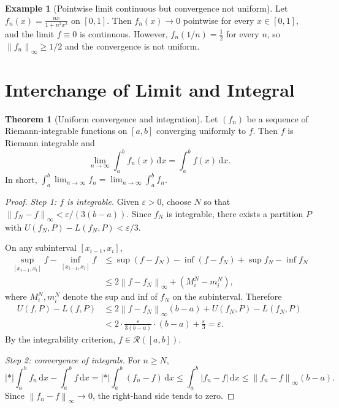 \documentclass[12pt,a4paper]{book}
\theoremstyle{definition}
\newtheorem{theorem}{Theorem}[chapter]
\newtheorem{example}{Example}[chapter]
\newcommand{\eps}{\varepsilon}
\newcommand{\abs}[1]{\left\lvert #1 \right\rvert}
\newcommand{\norm}[1]{\left\lVert #1 \right\rVert}
\newcommand{\dd}{\,\mathrm{d}}
\begin{document}
\begin{example}[Pointwise limit continuous but convergence not uniform]\label{ex:pw-cont-not-unif}
  Let $f_n(x)=\frac{nx}{1+n^2x^2}$ on $[0,1]$.  Then $f_n(x)\to0$
  pointwise for every $x\in[0,1]$, and the limit $f\equiv0$ is
  continuous.  However, $f_n(1/n)=\frac{1}{2}$ for every $n$, so
  $\norm{f_n}_\infty\ge 1/2$ and the convergence is not uniform.
\end{example}


\section{Interchange of Limit and Integral}\label{sec:interchange-int}

\begin{theorem}[Uniform convergence and integration]\label{thm:unif-int}
  Let $(f_n)$ be a sequence of Riemann-integrable functions on $[a,b]$
  converging uniformly to $f$.  Then $f$ is Riemann integrable and
  \[
    \lim_{n\to\infty}\int_a^b f_n(x)\dd x = \int_a^b f(x)\dd x.
  \]
  In short, $\displaystyle\int_a^b\lim_{n\to\infty}f_n
  = \lim_{n\to\infty}\int_a^b f_n$.
\end{theorem}

\begin{proof}
  \emph{Step 1: $f$ is integrable.}\;
  Given $\eps>0$, choose $N$ so that $\norm{f_N-f}_\infty<\eps/(3(b-a))$.
  Since $f_N$ is integrable, there exists a partition $P$ with
  $U(f_N,P)-L(f_N,P)<\eps/3$.

  On any subinterval $[x_{i-1},x_i]$,
  \begin{align*}
    \sup_{[x_{i-1},x_i]}f - \inf_{[x_{i-1},x_i]}f
    &\le \sup(f-f_N) - \inf(f-f_N) + \sup f_N - \inf f_N \\
    &\le 2\norm{f-f_N}_\infty + (M_i^N - m_i^N),
  \end{align*}
  where $M_i^N,m_i^N$ denote the sup and inf of $f_N$ on the subinterval.
  Therefore
  \begin{align*}
    U(f,P)-L(f,P)
    &\le 2\norm{f-f_N}_\infty(b-a) + U(f_N,P)-L(f_N,P) \\
    &< 2\cdot\frac{\eps}{3(b-a)}\cdot(b-a) + \frac{\eps}{3} = \eps.
  \end{align*}
  By the integrability criterion, $f\in\mathcal{R}([a,b])$.

  \emph{Step 2: convergence of integrals.}\;
  For $n\ge N$,
  \[
    \abs*{\int_a^b f_n\dd x - \int_a^b f\dd x}
    = \abs*{\int_a^b(f_n-f)\dd x}
    \le \int_a^b\abs{f_n-f}\dd x
    \le \norm{f_n-f}_\infty(b-a).
  \]
  Since $\norm{f_n-f}_\infty\to0$, the right-hand side tends to zero.
\end{proof}
\end{document}
